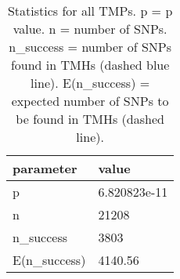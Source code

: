 \begin{table}

\caption{\label{tab:snp_stats}Statistics for all TMPs. p = p value. n = number of SNPs. n\_success = number of SNPs found in TMHs (dashed blue line). E(n\_success) = expected number of SNPs to be found in TMHs (dashed line). }
\centering
\begin{tabular}[t]{l|l}
\hline
parameter & value\\
\hline
p & 6.820823e-11\\
\hline
n & 21208\\
\hline
n\_success & 3803\\
\hline
E(n\_success) & 4140.56\\
\hline
\end{tabular}
\end{table}
